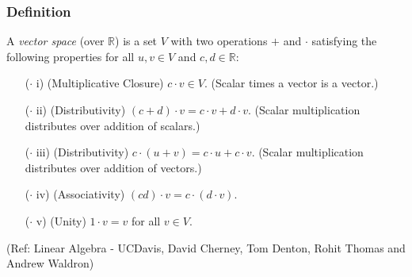 \begin{frame}[fragile]
\frametitle{Definition}

\begin{definition} A \emph{vector space} (over $\mathbb{R}$) is a set $V$ with two operations $+$ and $\cdot$ satisfying the following properties for all $u, v \in V$ and $c, d \in \mathbb{R}$:

\begin{itemize}


\item[($\cdot$ i)] (Multiplicative Closure) $c\cdot v \in V$.  (Scalar times a vector is a vector.)

\item[($\cdot$ ii)] (Distributivity) $(c+d) \cdot v= c\cdot v + d\cdot v$.  (Scalar multiplication distributes over addition of scalars.)

\item[($\cdot$ iii)] (Distributivity) $c\cdot (u+v)= c\cdot u + c\cdot v$.  (Scalar multiplication distributes over addition of vectors.) 

\item[($\cdot$ iv)] (Associativity) $ (cd)\cdot v = c \cdot (d \cdot v)$. 

\item[($\cdot$ v)] (Unity) $1\cdot v = v$ for all $v \in V$.
\end{itemize}
\end{definition}

\tiny{(Ref: Linear Algebra - UCDavis, David Cherney, Tom Denton, Rohit Thomas and Andrew Waldron)}

\end{frame}


